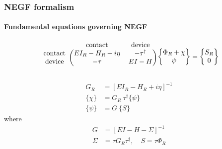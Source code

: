 \documentclass{beamer}
\begin{document}
{

    \begin{frame}

        \frametitle{NEGF formalism}
        \framesubtitle{Fundamental equations governing NEGF}
        \scriptsize

\vspace{12pt}
\begin{equation*}
\begin{blockarray}{ccc}
& \text{contact} & \text{device} \\
\begin{block}{c(cc)}
\text{contact} & EI_{R}-H_{R}+i\eta & -\tau^{\dagger} \\
\text{device} & -\tau & EI-H \\
\end{block}
\end{blockarray}
\begin{Bmatrix}
    \Phi_{R}+\chi \\
    \psi \\
\end{Bmatrix} = 
\begin{Bmatrix}
    S_{R} \\
    0 
\end{Bmatrix}
\end{equation*}

\begin{align*}
   G_{R} &= [EI_{R}-H_{R}+i\eta]^{-1} \\
   \{\chi\} &= G_{R}\ \tau^{\dagger}\{\psi\} \\
   \{\psi\} &= G \ \{S\} 
\end{align*}
where
\begin{align*}
    G &= [EI-H-\Sigma]^{-1} \\
    \Sigma &= \tau G_{R} \tau^{\dagger}, \quad S = \tau \Phi_{R}
\end{align*}
\vspace{-6pt}

    \end{frame}
}
\end{document}
